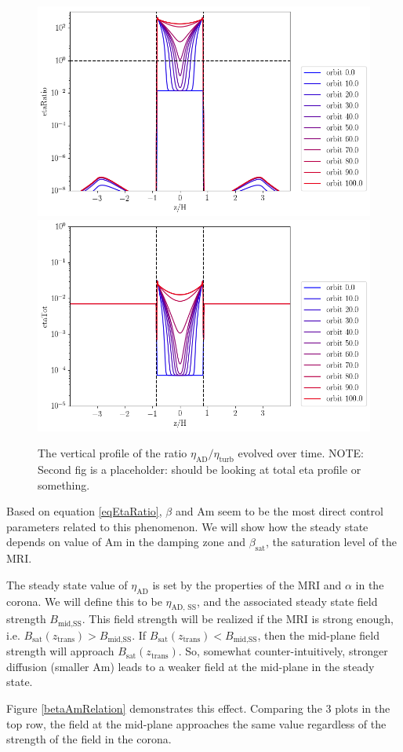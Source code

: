 \begin{figure}[p]
\centering
\includegraphics[width=0.49\columnwidth]{figs/figsChapter5/fiducialForPaper/withAD/etaRatio.png}
\includegraphics[width=0.49\columnwidth]{figs/figsChapter5/fiducialForPaper/withAD/etaTot.png}
\caption{The vertical profile of the ratio $\eta_\text{AD}/\eta_\text{turb}$ evolved over time.  NOTE: Second fig is a placeholder: should be looking at total eta profile or something.  }
\label{etaRatio}
\end{figure}

Based on equation \ref{eqEtaRatio}, $\beta$ and Am seem to be the most direct control parameters related to this phenomenon.  We will show how the steady state depends on value of Am in the damping zone and $\beta_{\text{sat}}$, the saturation level of the MRI.

The steady state value of $\eta_{\text{AD}}$ is set by the properties of the MRI and $\alpha$ in the corona.  We will define this to be $\eta_{\text{AD, SS}}$, and the associated steady state field strength $B_{\text{mid,SS}}$.  This field strength will be realized if the MRI is strong enough, i.e. $B_{\text{sat}}(z_\text{trans}) > B_{\text{mid,SS}}$.  If $B_{\text{sat}}(z_\text{trans}) < B_{\text{mid,SS}}$, then the mid-plane field strength will approach $B_{\text{sat}}(z_\text{trans})$.  So, somewhat counter-intuitively, stronger diffusion (smaller Am) leads to a weaker field at the mid-plane in the steady state.  

Figure \ref{betaAmRelation} demonstrates this effect.  Comparing the 3 plots in the top row, the field at the mid-plane approaches the same value regardless of the strength of the field in the corona.  

